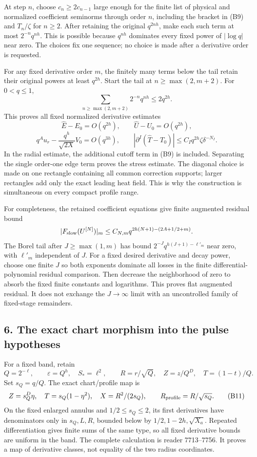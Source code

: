 \documentclass[10pt,a4paper]{article}
\begin{document}
At step \(n\), choose \(c_n\ge2c_{n-1}\) large enough for the finite list of physical and normalized coefficient seminorms through order \(n\), including the bracket in (B9) and \(T_n/\zeta\) for \(n\ge2\). After retaining the original \(q^{2nh}\), make each such term at most \(2^{-n}q^{nh}\). This is possible because \(q^{nh}\) dominates every fixed power of \(|\log q|\) near zero. The choices fix one sequence; no choice is made after a derivative order is requested.

For any fixed derivative order \(m\), the finitely many terms below the tail retain their original powers at least \(q^{2h}\). Start the tail at \(n\ge\max(2,m+2)\). For \(0<q\le1\), \[
\sum_{n\ge\max(2,m+2)}2^{-n}q^{nh}\le2q^{2h}.
\] This proves all fixed normalized derivative estimates \[
\widehat E-E_0=O(q^{2h}),\qquad\widehat U-U_0=O(q^{2h}),
\] \[
q^Au_r-\frac{q^h}{\sqrt{2X}}V_0=O(q^{3h}),
\qquad
|\partial^I(\widehat T-T_0)|\le C_Iq^{2h}\zeta\delta^{-N_I}.
\tag{B10}
\] In the radial estimate, the additional cutoff term in (B9) is included. Separating the single order-one edge term proves the stress estimate. The diagonal choice is made on one rectangle containing all common correction supports; larger rectangles add only the exact leading heat field. This is why the construction is simultaneous on every compact profile range.

For completeness, the retained coefficient equations give finite augmented residual bound \[
|F_{\rm slow}(U^{[N]})|_m\le C_{N,m}q^{2h(N+1)-(2A+1/2+m)}.
\] The Borel tail after \(J\ge\max(1,m)\) has bound \(2^{-J}q^{h(J+1)-\ell'_m}\) near zero, with \(\ell'_m\) independent of \(J\). For a fixed desired derivative and decay power, choose one finite \(J\) so both exponents dominate all losses in the finite differential-polynomial residual comparison. Then decrease the neighborhood of zero to absorb the fixed finite constants and logarithms. This proves flat augmented residual. It does not exchange the \(J\to\infty\) limit with an uncontrolled family of fixed-stage remainders.

\subsection{6. The exact chart morphism into the pulse hypotheses}\label{gclosure:the-exact-chart-morphism-into-the-pulse-hypotheses}

For a fixed band, retain \[
Q=2^{-\ell},\qquad\varepsilon=Q^h,\quad S_*=\ell^2,
\qquad R=r/\sqrt Q,\quad Z=z/Q^D,\quad T=(1-t)/Q.
\] Set \(s_Q=q/Q\). The exact chart/profile map is \[
Z=s_Q^D\eta,\quad T=s_Q(1-\eta^2),\quad X=R^2/(2s_Q),
\qquad R_{\rm profile}=R/\sqrt{s_Q}.
\tag{B11}
\] On the fixed enlarged annulus and \(1/2\le s_Q\le2\), its first derivatives have denominators only in \(s_Q,L,R\), bounded below by \(1/2,1-2h,\sqrt{X_a}\). Repeated differentiation gives finite sums of the same type, so all fixed derivative bounds are uniform in the band. The complete calculation is reader 7713--7756. It proves a map of derivative classes, not equality of the two radius coordinates.
\end{document}
